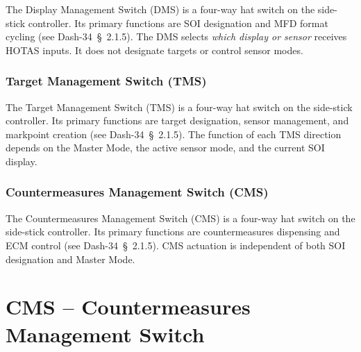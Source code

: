 \documentclass[11pt, a4paper, twoside]{report}
\newcommand{\dashref}[1]{Dash-34~\S~#1}
\begin{document}
The Display Management Switch (DMS) is a four-way hat switch on the side-stick controller. Its primary functions are SOI designation and MFD format cycling (see \dashref{2.1.5}). The DMS selects \textit{which display or sensor} receives HOTAS inputs. It does not designate targets or control sensor modes.

\subsection{Target Management Switch (TMS)}
\label{sec:C2-S3-S2}

The Target Management Switch (TMS) is a four-way hat switch on the side-stick controller. Its primary functions are target designation, sensor management, and markpoint creation (see \dashref{2.1.5}). The function of each TMS direction depends on the Master Mode, the active sensor mode, and the current SOI display.

\subsection{Countermeasures Management Switch (CMS)}
\label{sec:C2-S3-S3}

The Countermeasures Management Switch (CMS) is a four-way hat switch on the side-stick controller. Its primary functions are countermeasures dispensing and ECM control (see \dashref{2.1.5}). CMS actuation is independent of both SOI designation and Master Mode.

\chapter{CMS – Countermeasures Management Switch}
\label{chap:C5}

\end{document}
